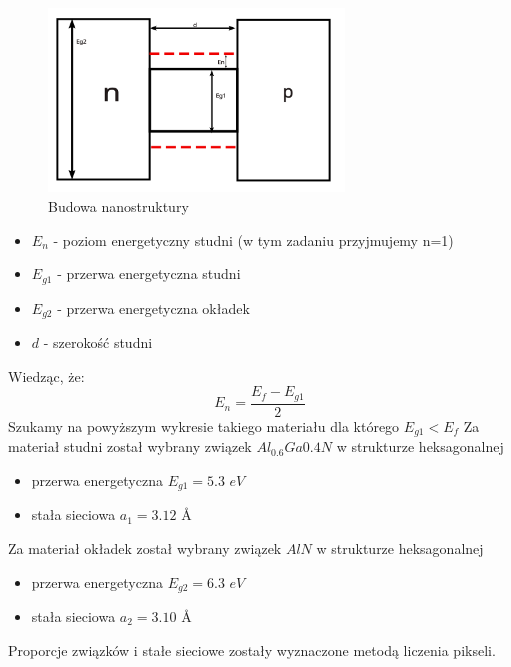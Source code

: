 \documentclass{article}
\begin{document}
\setcounter{figure}{0}
\renewcommand{\figurename}{Schemat}
\begin{figure}[ht!]
    \centering
    \includegraphics[width=0.7\textwidth]{./misc/scheme.png}
    \caption{Budowa nanostruktury}
    \centering
\end{figure}

\begin{itemize}
	\item $ E_n $ - poziom energetyczny studni (w tym zadaniu przyjmujemy n=1)
	\item $ E_{g1} $ - przerwa energetyczna studni
	\item $ E_{g2} $ - przerwa energetyczna okładek 
	\item $ d $ - szerokość studni 
\end{itemize}

Wiedząc, że:
\begin{equation}\label{En}
E_n = \frac{E_f - E_{g1}}{2}
\end{equation}
Szukamy na powyższym wykresie takiego materiału dla którego $E_{g1}<E_f$
Za materiał studni został wybrany związek $Al_{0.6}Ga{0.4}N$ w strukturze heksagonalnej
\begin{itemize}
	\item przerwa energetyczna $E_{g1}=5.3$ $eV$
	\item stała sieciowa $a_1=3.12$ \AA
\end{itemize}

Za materiał okładek został wybrany związek $AlN$ w strukturze heksagonalnej

\begin{itemize}
	\item przerwa energetyczna $E_{g2}=6.3$ $eV$
	\item stała sieciowa $a_2=3.10$ \AA
\end{itemize}

Proporcje związków i stałe sieciowe zostały wyznaczone metodą liczenia pikseli.
\end{document}
